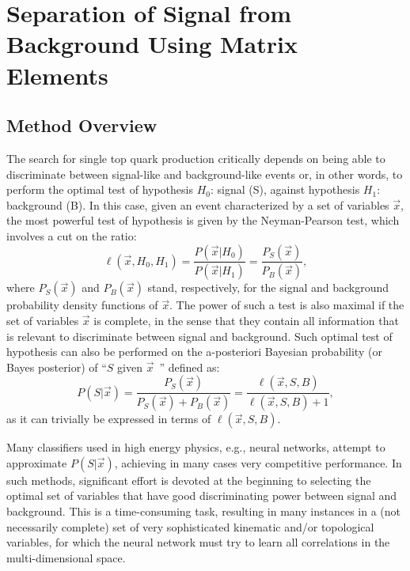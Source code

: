\section{Separation of Signal from Background Using Matrix Elements}
\label{separation-ME}

\subsection{Method Overview}
\label{method-overview}

The search for single top quark production critically depends on being
able to discriminate between signal-like and background-like events
or, in other words, to perform the optimal test of hypothesis $H_0$:
signal (S), against hypothesis $H_1$: background (B). In this case,
given an event characterized by a set of variables $\vec{x}$, the most
powerful test of hypothesis is given by the Neyman-Pearson test, which
involves a cut on the ratio:
\begin{equation}
\label{disc}
\ell(\vec{x},H_0,H_1) = \frac{P(\vec{x}|H_0)}{P(\vec{x}|H_1)}
= \frac{P_S(\vec{x})}{P_B(\vec{x})},
\end{equation}
\noindent where $P_S(\vec{x})$ and $P_B(\vec{x})$ stand,
respectively, for the signal and background probability density
functions of $\vec{x}$. The power of such a test is also maximal if
the set of variables $\vec{x}$ is complete, in the sense that they
contain all information that is relevant to discriminate between
signal and background. Such optimal test of hypothesis can also be
performed on the a-posteriori Bayesian probability (or Bayes
posterior) of ``$S$ given $\vec{x}$~'' defined as:
\begin{equation}
\label{post}
P(S|\vec{x}) = \frac{P_S(\vec{x})}{P_S(\vec{x}) + P_B(\vec{x})} =
\frac{\ell(\vec{x},S,B)}{\ell(\vec{x},S,B)+1},
\end{equation}
\noindent as it can trivially be expressed in terms of
$\ell(\vec{x},S,B)$.

Many classifiers used in high energy physics, e.g., neural networks,
attempt to approximate $P(S|\vec{x})$, achieving in many cases very
competitive performance. In such methods, significant effort is
devoted at the beginning to selecting the optimal set of variables
that have good discriminating power between signal and
background. This is a time-consuming task, resulting in many instances
in a (not necessarily complete) set of very sophisticated kinematic
and/or topological variables, for which the neural network must try to
learn all correlations in the multi-dimensional space.

